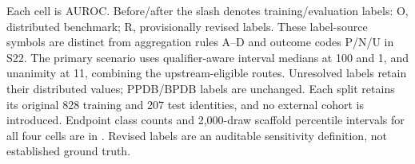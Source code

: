 Each cell is AUROC. Before/after the slash denotes training/evaluation labels: O, distributed benchmark; R, provisionally revised labels. These label-source symbols are distinct from aggregation rules A--D and outcome codes P/N/U in S22. The primary scenario uses qualifier-aware interval medians at 100 and 1, and unanimity at 11, combining the upstream-eligible routes. Unresolved labels retain their distributed values; PPDB/BPDB labels are unchanged. Each split retains its original 828 training and 207 test identities, and no external cohort is introduced. Endpoint class counts and 2,000-draw scaffold percentile intervals for all four cells are in . Revised labels are an auditable sensitivity definition, not established ground truth.

\begingroup\small\setlength{\tabcolsep}{4pt}

